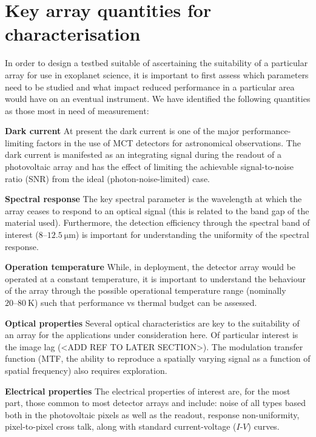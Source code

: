 \documentclass[a4paper]{spie}
\begin{document}
\section{Key array quantities for characterisation}
In order to design a testbed suitable of ascertaining the suitability of a particular array for use in exoplanet science, it is important to first assess which parameters need to be studied and what impact reduced performance in a particular area would have on an eventual instrument. We have identified the following quantities as those most in need of measurement:
\begin{description}
\item \textbf{Dark current} At present the dark current is one of the major performance-limiting factors in the use of MCT detectors for astronomical observations. The dark current is manifested as an integrating signal during the readout of a photovoltaic array and has the effect of limiting the achievable signal-to-noise ratio (SNR) from the ideal (photon-noise-limited) case.
\item \textbf{Spectral response} The key spectral parameter is the wavelength at which the array ceases to respond to an optical signal (this is related to the band gap of the material used). Furthermore, the detection efficiency through the spectral band of interest ($8\mbox{--}12.5~\si{\micro\metre}$) is important for understanding the uniformity of the spectral response.
\item \textbf{Operation temperature} While, in deployment, the detector array would be operated at a constant temperature, it is important to understand the behaviour of the array through the possible operational temperature range (nominally $20\mbox{--}80~\si{\kelvin}$) such that performance vs thermal budget can be assessed.
\item \textbf{Optical properties} Several optical characteristics are key to the suitability of an array for the applications under consideration here. Of particular interest is the image lag (<ADD REF TO LATER SECTION>). The modulation transfer function (MTF, the ability to reproduce a spatially varying signal as a function of spatial frequency) also requires exploration.
\item \textbf{Electrical properties} The electrical properties of interest are, for the most part, those common to most detector arrays and include: noise of all types based both in the photovoltaic pixels as well as the readout, response non-uniformity, pixel-to-pixel cross talk, along with standard current-voltage ($I\mbox{-}V$) curves.
\end{description}
%
\end{document}
